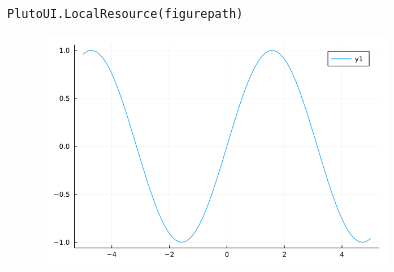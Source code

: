 \begin{lstlisting}[language=JuliaLocal, style=julia]
PlutoUI.LocalResource(figurepath)
\end{lstlisting}

\begin{figure}[H]
	\centering
	\includegraphics[width=0.8\textwidth]{./figures/plotexample.png}
	\label{fig:/home/davibarreira/MEGA/EMAp/NotebookToLatex.jl/example/plotexample.png}

\end{figure}
